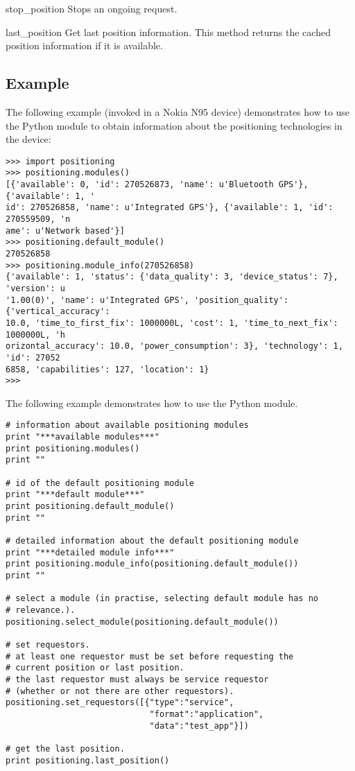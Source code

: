 \begin{funcdesc}{stop_position}{}
Stops an ongoing  request.
\end{funcdesc}

\begin{funcdesc}{last_position}{}
Get last position information. 
This method returns the cached position information if it is available.
\end{funcdesc}

\subsection{Example \label{position-example}}

The following example (invoked in a Nokia N95 device) demonstrates how to use 
the Python  module to obtain information about the 
positioning technologies in the device:

\begin{verbatim}
>>> import positioning
>>> positioning.modules()
[{'available': 0, 'id': 270526873, 'name': u'Bluetooth GPS'}, {'available': 1, '
id': 270526858, 'name': u'Integrated GPS'}, {'available': 1, 'id': 270559509, 'n
ame': u'Network based'}]
>>> positioning.default_module()
270526858
>>> positioning.module_info(270526858)
{'available': 1, 'status': {'data_quality': 3, 'device_status': 7}, 'version': u
'1.00(0)', 'name': u'Integrated GPS', 'position_quality': {'vertical_accuracy':
10.0, 'time_to_first_fix': 1000000L, 'cost': 1, 'time_to_next_fix': 1000000L, 'h
orizontal_accuracy': 10.0, 'power_consumption': 3}, 'technology': 1, 'id': 27052
6858, 'capabilities': 127, 'location': 1}
>>>
\end{verbatim}

The following example demonstrates how to use the Python  
module.

\begin{verbatim}
# information about available positioning modules
print "***available modules***"
print positioning.modules()
print ""

# id of the default positioning module
print "***default module***"
print positioning.default_module()
print ""

# detailed information about the default positioning module
print "***detailed module info***"
print positioning.module_info(positioning.default_module())
print ""

# select a module (in practise, selecting default module has no 
# relevance.). 
positioning.select_module(positioning.default_module())

# set requestors.
# at least one requestor must be set before requesting the 
# current position or last position.
# the last requestor must always be service requestor 
# (whether or not there are other requestors). 
positioning.set_requestors([{"type":"service",
                             "format":"application",
                             "data":"test_app"}])
                            
# get the last position.
print positioning.last_position()
\end{verbatim}

